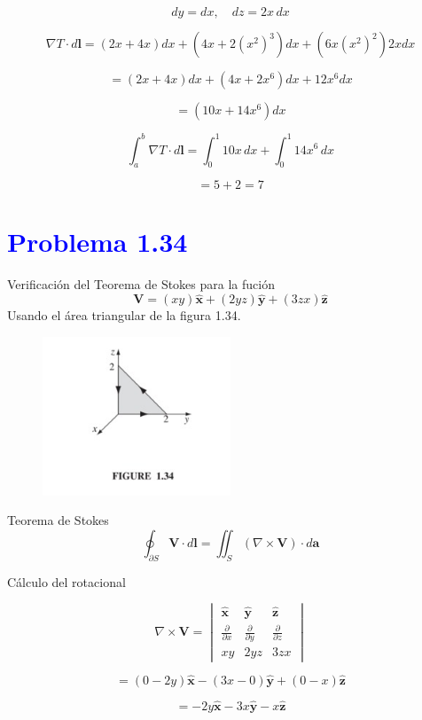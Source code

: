 \documentclass[12pt]{article}
\newcommand{\question}[1]{\textcolor{blue}{\textbf{#1}}}
\begin{document}
\[
dy = dx, \quad dz = 2x \, dx
\]

\[
\nabla T \cdot d\mathbf{l} = (2x + 4x)dx + (4x + 2(x^2)^3)dx + (6x(x^2)^2)2x dx
\]

\[
= (2x + 4x)dx + (4x + 2x^6)dx + 12x^6 dx
\]

\[
= (10x + 14x^6)dx
\]

\[
\int_a^b \nabla T \cdot d\mathbf{l} = \int_0^1 10x \, dx + \int_0^1 14x^6 \, dx
\]

\[
= 5 + 2 = \boxed{7}
\]

\section*{\question{Problema  1.34}}
Verificación del Teorema de Stokes para la fución 
\[
\mathbf{V} = (xy) \hat{\mathbf{x}} + (2yz) \hat{\mathbf{y}} + (3zx) \hat{\mathbf{z}}
\] Usando el área triangular de la figura 1.34.
\begin{figure}[h!] 
    \centering
    \includegraphics[width=0.5\textwidth]{imagenes/punto_34.jpg} 
    \label{fig:mi_figura}
\end{figure}


Teorema de Stokes
\[
\oint_{\partial S} \mathbf{V} \cdot d\mathbf{l} = \iint_{S} (\nabla \times \mathbf{V}) \cdot d\mathbf{a}
\]

Cálculo del rotacional

\[
\nabla \times \mathbf{V} =
\begin{vmatrix}
\hat{\mathbf{x}} & \hat{\mathbf{y}} & \hat{\mathbf{z}} \\
\frac{\partial}{\partial x} & \frac{\partial}{\partial y} & \frac{\partial}{\partial z} \\
xy & 2yz & 3zx
\end{vmatrix}
\]

\[
= (0 - 2y) \hat{\mathbf{x}} - (3x - 0) \hat{\mathbf{y}} + (0 - x) \hat{\mathbf{z}}
\]

\[
= -2y \hat{\mathbf{x}} - 3x \hat{\mathbf{y}} - x \hat{\mathbf{z}}
\]
\end{document}
